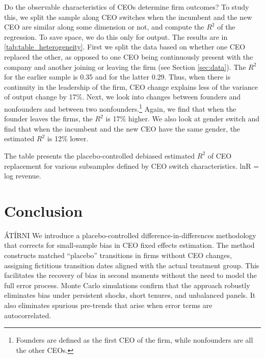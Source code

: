 \documentclass[sigconf,nonacm]{acmart}
\newcommand{\tablepath}{papers/econometrics/table}
\begin{document}
Do the observable characteristics of CEOs determine firm outcomes? To study this, we split the sample along CEO switches when the incumbent and the new CEO are similar along some dimension or not, and compute the $R^2$ of the regression. To save space, we do this only for output. The results are in \ref{tab:table_heterogeneity}. First we split the data based on whether one CEO replaced the other, as opposed to one CEO being continuously present with the company and another joining or leaving the firm (see Section \ref{sec:data}). The $R^2$ for the earlier sample is 0.35 and for the latter 0.29. Thus, when there is continuity in the leadership of the firm, CEO change explains less of the variance of output change by 17\%. Next, we look into changes between founders and nonfounders and between two nonfounders.\footnote{Founders are defined as the first CEO of the firm, while nonfounders are all the other CEOs.} Again, we find that when the founder leaves the firms, the $R^2$ is 17\% higher. We also look at gender switch and find that when the incumbent and the new CEO have the same gender, the estimated $R^2$ is 12\% lower. %
\begin{table}[t]
    \centering
    \caption{Analysis of Variance in Subsamples}
    \vspace{.2cm}
    \label{tab:table_heterogeneity}
    
    \begin{minipage}{\textwidth}
    \vspace{.2cm}
    \footnotesize{The table presents the placebo-controlled debiased estimated $R^2$ of CEO replacement for various subsamples defined by CEO switch characteristics. lnR = log revenue.}
    \end{minipage}
\end{table}



\clearpage

\section{Conclusion}\label{sec:concl}

ÁTÍRNI We introduce a placebo-controlled difference-in-differences methodology that corrects for small-sample bias in CEO fixed effects estimation. The method constructs matched “placebo” transitions in firms without CEO changes, assigning fictitious transition dates aligned with the actual treatment group. This facilitates the recovery of bias in second moments without the need to model the full error process. Monte Carlo simulations confirm that the approach robustly eliminates bias under persistent shocks, short tenures, and unbalanced panels. It also eliminates spurious pre-trends that arise when error terms are autocorrelated.
\end{document}

